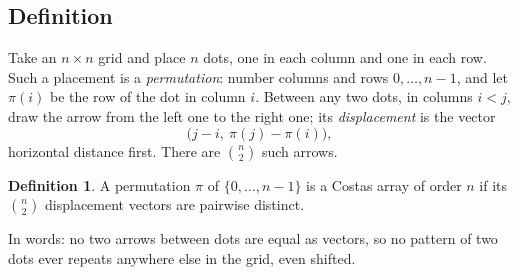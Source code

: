 \documentclass[11pt,a4paper]{article}
\theoremstyle{definition}
\newtheorem{definition}[theorem]{Definition}
\begin{document}

\subsection{Definition}

Take an $n\times n$ grid and place $n$ dots, one in each column and one in each row. Such a
placement is a \emph{permutation}: number columns and rows $0,\dots,n-1$, and let $\pi(i)$ be
the row of the dot in column $i$. Between any two dots, in columns $i<j$, draw the arrow from
the left one to the right one; its \emph{displacement} is the vector
\[
\bigl(j-i,\ \pi(j)-\pi(i)\bigr),
\]
horizontal distance first. There are $\binom n2$ such arrows.

\begin{definition}
A permutation $\pi$ of $\{0,\dots,n-1\}$ is a Costas array of order $n$ if its
$\binom n2$ displacement vectors are pairwise distinct.
\end{definition}

In words: no two arrows between dots are equal as vectors, so no pattern of two dots ever
repeats anywhere else in the grid, even shifted.
\end{document}
